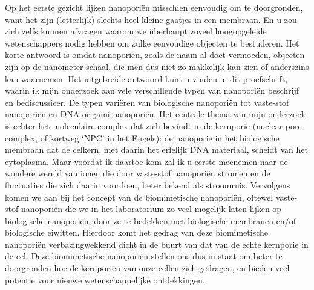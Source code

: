 {

Op het eerste gezicht lijken nanopori\"{e}n misschien eenvoudig om te doorgronden, want het zijn (letterlijk) slechts heel kleine gaatjes in een membraan. En u zou zich zelfs kunnen afvragen waarom we \"{u}berhaupt zoveel hoogopgeleide wetenschappers nodig hebben om zulke eenvoudige objecten te bestuderen. Het korte antwoord is omdat nano\-poriën, zoals de naam al doet vermoeden, objecten zijn op de nanometer schaal, die men dus niet zo makkelijk kan zien of anderszins kan waarnemen. Het uitgebreide antwoord kunt u vinden in dit proefschrift, waarin ik mijn onderzoek aan vele verschillende typen van nano\-poriën beschrijf en bediscussieer. De typen variëren van biologische nano\-poriën tot vaste-stof nano\-poriën en DNA-origami nano\-poriën. Het centrale thema van mijn onderzoek is echter het moleculaire complex dat zich bevindt in de kernporie (nuclear pore complex, of kortweg `NPC' in het Engels): de nanoporie in het biologische membraan dat de celkern, met daarin het erfelijk DNA materiaal, scheidt van het cytoplasma.
Maar voordat ik daartoe kom zal ik u eerste meenemen naar de wondere wereld van ionen die door vaste-stof nano\-poriën stromen en de fluctuaties die zich daarin voordoen, beter bekend als stroomruis. Vervolgens komen we aan bij het concept van de biomimetische nano\-poriën, oftewel vaste-stof nano\-poriën die we in het laboratorium zo veel mogelijk laten lijken op biologische nano\-poriën, door ze te bedekken met bio\-logische membranen en/of biologische eiwitten. Hierdoor komt het gedrag van deze biomimetische nano\-poriën verbazingwekkend dicht in de buurt van dat van de echte kernporie in de cel. Deze biomimetische nano\-poriën stellen ons dus in staat om beter te doorgronden hoe de kernporiën van onze cellen zich gedragen, en bieden veel potentie voor nieuwe wetenschappelijke ontdekkingen.\\[0.5pt]
	
}
